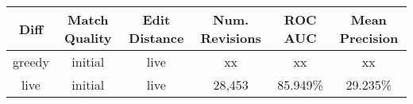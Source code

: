 \begin{sidewaystable}[!tp]
  \begin{center}
    \begin{tabular}{|c|c|c||c|c|c|}
\hline
Diff & Match Quality & Edit Distance & Num. Revisions
	& ROC AUC & Mean Precision \\
\hline
\hline
greedy & initial & live & xx & xx & xx \\
live & initial & live & 28,453 & 85.949\% & 29.235\% \\
\hline
    \end{tabular}
  \end{center}
\end{sidewaystable}

